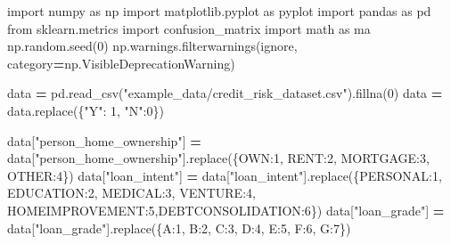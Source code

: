 \documentclass[
]{book}
\newenvironment{Shaded}{\begin{snugshade}}{\end{snugshade}}
\newcommand{\DecValTok}[1]{\textcolor[rgb]{0.00,0.00,0.81}{#1}}
\newcommand{\ImportTok}[1]{#1}
\newcommand{\NormalTok}[1]{#1}
\newcommand{\OperatorTok}[1]{\textcolor[rgb]{0.81,0.36,0.00}{\textbf{#1}}}
\newcommand{\StringTok}[1]{\textcolor[rgb]{0.31,0.60,0.02}{#1}}
\begin{document}
\begin{Shaded}
\begin{Highlighting}[]
\ImportTok{import}\NormalTok{ numpy }\ImportTok{as}\NormalTok{ np}
\ImportTok{import}\NormalTok{ matplotlib.pyplot }\ImportTok{as}\NormalTok{ pyplot}
\ImportTok{import}\NormalTok{ pandas }\ImportTok{as}\NormalTok{ pd}
\ImportTok{from}\NormalTok{ sklearn.metrics }\ImportTok{import}\NormalTok{ confusion\_matrix}
\ImportTok{import}\NormalTok{ math }\ImportTok{as}\NormalTok{ ma}
\NormalTok{np.random.seed(}\DecValTok{0}\NormalTok{)}
\NormalTok{np.warnings.filterwarnings(}\StringTok{\textquotesingle{}ignore\textquotesingle{}}\NormalTok{, category}\OperatorTok{=}\NormalTok{np.VisibleDeprecationWarning) }

\NormalTok{data }\OperatorTok{=}\NormalTok{ pd.read\_csv(}\StringTok{"example\_data/credit\_risk\_dataset.csv"}\NormalTok{).fillna(}\DecValTok{0}\NormalTok{)}
\NormalTok{data }\OperatorTok{=}\NormalTok{ data.replace(\{}\StringTok{"Y"}\NormalTok{: }\DecValTok{1}\NormalTok{, }\StringTok{"N"}\NormalTok{:}\DecValTok{0}\NormalTok{\})}

\NormalTok{data[}\StringTok{"person\_home\_ownership"}\NormalTok{] }\OperatorTok{=}\NormalTok{ data[}\StringTok{"person\_home\_ownership"}\NormalTok{].replace(\{}\StringTok{\textquotesingle{}OWN\textquotesingle{}}\NormalTok{:}\DecValTok{1}\NormalTok{, }\StringTok{\textquotesingle{}RENT\textquotesingle{}}\NormalTok{:}\DecValTok{2}\NormalTok{, }\StringTok{\textquotesingle{}MORTGAGE\textquotesingle{}}\NormalTok{:}\DecValTok{3}\NormalTok{, }\StringTok{\textquotesingle{}OTHER\textquotesingle{}}\NormalTok{:}\DecValTok{4}\NormalTok{\})}
\NormalTok{data[}\StringTok{"loan\_intent"}\NormalTok{] }\OperatorTok{=}\NormalTok{ data[}\StringTok{"loan\_intent"}\NormalTok{].replace(\{}\StringTok{\textquotesingle{}PERSONAL\textquotesingle{}}\NormalTok{:}\DecValTok{1}\NormalTok{, }\StringTok{\textquotesingle{}EDUCATION\textquotesingle{}}\NormalTok{:}\DecValTok{2}\NormalTok{, }\StringTok{\textquotesingle{}MEDICAL\textquotesingle{}}\NormalTok{:}\DecValTok{3}\NormalTok{, }\StringTok{\textquotesingle{}VENTURE\textquotesingle{}}\NormalTok{:}\DecValTok{4}\NormalTok{, }\StringTok{\textquotesingle{}HOMEIMPROVEMENT\textquotesingle{}}\NormalTok{:}\DecValTok{5}\NormalTok{,}\StringTok{\textquotesingle{}DEBTCONSOLIDATION\textquotesingle{}}\NormalTok{:}\DecValTok{6}\NormalTok{\})}
\NormalTok{data[}\StringTok{"loan\_grade"}\NormalTok{] }\OperatorTok{=}\NormalTok{ data[}\StringTok{"loan\_grade"}\NormalTok{].replace(\{}\StringTok{\textquotesingle{}A\textquotesingle{}}\NormalTok{:}\DecValTok{1}\NormalTok{, }\StringTok{\textquotesingle{}B\textquotesingle{}}\NormalTok{:}\DecValTok{2}\NormalTok{, }\StringTok{\textquotesingle{}C\textquotesingle{}}\NormalTok{:}\DecValTok{3}\NormalTok{, }\StringTok{\textquotesingle{}D\textquotesingle{}}\NormalTok{:}\DecValTok{4}\NormalTok{, }\StringTok{\textquotesingle{}E\textquotesingle{}}\NormalTok{:}\DecValTok{5}\NormalTok{, }\StringTok{\textquotesingle{}F\textquotesingle{}}\NormalTok{:}\DecValTok{6}\NormalTok{, }\StringTok{\textquotesingle{}G\textquotesingle{}}\NormalTok{:}\DecValTok{7}\NormalTok{\})}



\end{Highlighting}
\end{Shaded}
\end{document}

